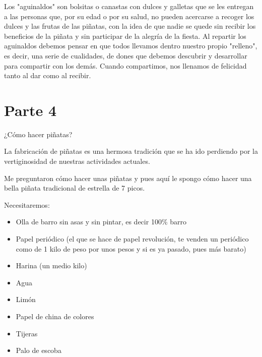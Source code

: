Los "aguinaldos" son bolsitas o canastas con dulces y galletas que se les entregan a las personas que, por su edad o por su salud, no pueden acercarse a recoger los dulces y las frutas de las piñatas, con la idea de que nadie se quede sin recibir los beneficios de la piñata y sin participar de la alegría de la fiesta.
Al repartir los aguinaldos debemos pensar en que todos llevamos dentro nuestro propio "relleno", es decir, una serie de cualidades, de dones que debemos descubrir y desarrollar para compartir con los demás. Cuando compartimos, nos llenamos de felicidad tanto al dar como al recibir.

\section{Parte 4}
¿Cómo hacer piñatas?

La fabricación de piñatas es una hermosa tradición que se ha ido perdiendo por la vertiginosidad de nuestras actividades actuales.

Me preguntaron cómo hacer unas piñatas y pues aquí le spongo cómo hacer una bella piñata tradicional de estrella de 7 picos.

Necesitaremos:

\begin{itemize}
\item Olla de barro sin asas y sin pintar, es decir 100\% barro
\item Papel periódico (el que se hace de papel revolución, te venden un periódico como de 1 kilo de peso por unos pesos y si es ya pasado, pues más barato)
\item Harina (un medio kilo)
\item Agua
\item Limón
\item Papel de china de colores
\item Tijeras
\item Palo de escoba
\end{itemize}

